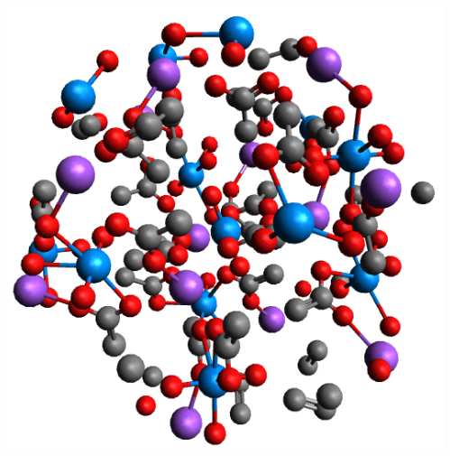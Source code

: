 \documentclass[10pt, xcolor=x11names, compress]{beamer}
\begin{document}
\begin{frame}
\begin{columns}[T]
\begin{column}{0.5\linewidth}
\begin{center}
      \end{center}
    \end{column}
    \begin{column}{0.5\linewidth}
      \begin{center}
        \includegraphics[width=0.6\linewidth]{images/NaU_triacetate_full.png}

      \end{center}
    \end{column}
  \end{columns}
\end{frame}
\end{document}
